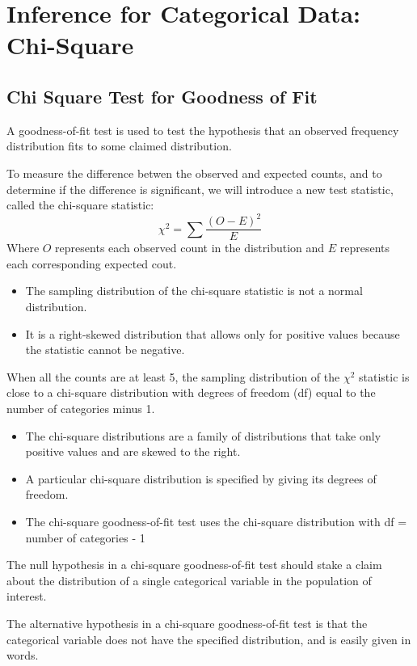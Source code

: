 \documentclass[../stats.tex]{subfiles}
\begin{document}
\chapter{Inference for Categorical Data: Chi-Square}
\section{Chi Square Test for Goodness of Fit}
A goodness-of-fit test is used to test the hypothesis that an observed frequency distribution fits to some claimed distribution.

To measure the difference betwen the observed and expected counts, and to determine if the difference is significant, we will introduce a new test statistic, called the chi-square statistic:
\[ \chi^2 = \sum \frac{(O-E)^2}{E} \]
Where $O$ represents each observed count in the distribution and $E$ represents each corresponding expected cout.
\begin{itemize}
    \item The sampling distribution of the chi-square statistic is not a normal distribution.
    \item It is a right-skewed distribution that allows only for positive values because the statistic cannot be negative.
\end{itemize}

When all the counts are at least 5, the sampling distribution of the $\chi^2$ statistic is close to a chi-square distribution with degrees of freedom (df) equal to the number of categories minus 1.
\begin{itemize}
    \item The chi-square distributions are a family of distributions that take only positive values and are skewed to the right.
    \item A particular chi-square distribution is specified by giving its degrees of freedom.
    \item The chi-square goodness-of-fit test uses the chi-square distribution with df = number of categories - 1
\end{itemize}

The null hypothesis in a chi-square goodness-of-fit test should stake a claim about the distribution of a single categorical variable in the population of interest.

The alternative hypothesis in a chi-square goodness-of-fit test is that the categorical variable does not have the specified distribution, and is easily given in words.
\end{document}
